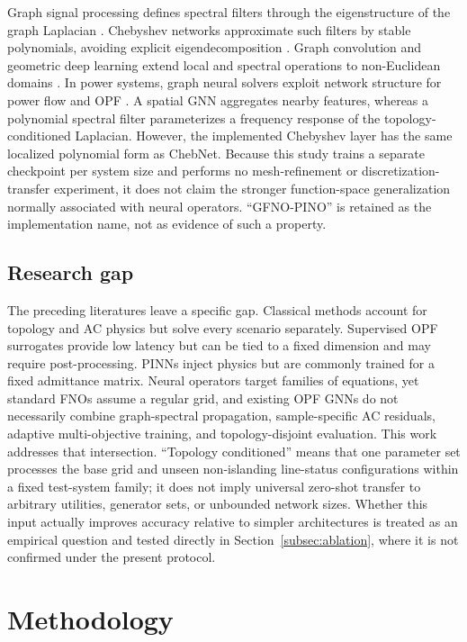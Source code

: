 \documentclass[final,5p,times,twocolumn]{elsarticle}
\begin{document}
Graph signal processing defines spectral filters through the eigenstructure of
the graph Laplacian \cite{hammond2011wavelets}. Chebyshev networks approximate
such filters by stable polynomials, avoiding explicit eigendecomposition
\cite{defferrard2016chebnet}. Graph convolution and geometric deep learning
extend local and spectral operations to non-Euclidean domains
\cite{kipf2017gcn,bronstein2017geometric}. In power systems, graph neural
solvers exploit network structure for power flow and OPF
\cite{donon2019graphsolver,owerko2020opfgnn}. A spatial GNN aggregates nearby
features, whereas a polynomial spectral filter parameterizes a frequency
response of the topology-conditioned Laplacian. However, the implemented
Chebyshev layer has the same localized polynomial form as ChebNet. Because
this study trains a separate checkpoint per system size and performs no
mesh-refinement or discretization-transfer experiment, it does not claim the
stronger function-space generalization normally associated with neural
operators. ``GFNO-PINO'' is retained as the implementation name, not as
evidence of such a property.

\subsection{Research gap}

The preceding literatures leave a specific gap. Classical methods account for
topology and AC physics but solve every scenario separately. Supervised OPF
surrogates provide low latency but can be tied to a fixed dimension and may
require post-processing. PINNs inject physics but are commonly trained for a
fixed admittance matrix. Neural operators target families of equations, yet
standard FNOs assume a regular grid, and existing OPF GNNs do not necessarily
combine graph-spectral propagation, sample-specific AC residuals, adaptive
multi-objective training, and topology-disjoint evaluation. This work addresses
that intersection. ``Topology conditioned'' means that one parameter set
processes the base grid and unseen non-islanding line-status configurations
within a fixed test-system family; it does not imply universal zero-shot
transfer to arbitrary utilities, generator sets, or unbounded network sizes.
Whether this input actually improves accuracy relative to simpler
architectures is treated as an empirical question and tested directly in
Section~\ref{subsec:ablation}, where it is not confirmed under the present
protocol.

\section{Methodology}
\label{sec:methodology}
\end{document}
